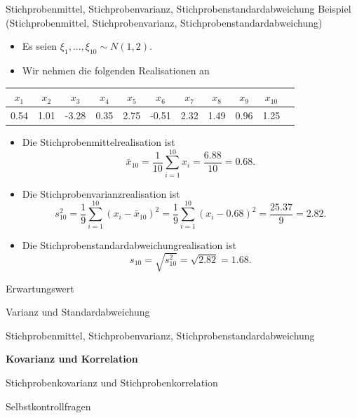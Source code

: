 \documentclass[
  8pt,
  ignorenonframetext,
]{beamer}
\providecommand{\tightlist}{%
  \setlength{\itemsep}{0pt}\setlength{\parskip}{0pt}}
\begin{document}
\begin{frame}{Stichprobenmittel, Stichprobenvarianz,
Stichprobenstandardabweichung}
\protect\hypertarget{stichprobenmittel-stichprobenvarianz-stichprobenstandardabweichung-1}{}
Beispiel (Stichprobenmittel, Stichprobenvarianz,
Stichprobenstandardabweichung) \vspace{2mm}

\footnotesize

\begin{itemize}
\tightlist
\item
  Es seien \(\xi_1,...,\xi_{10} \sim N(1,2)\).
\item
  Wir nehmen die folgenden Realisationen an
\end{itemize}

\begin{table}[h]
\begin{center}
\begin{tabular}{ccccccccccc}
   $x_1$
&  $x_2$
&  $x_3$
&  $x_4$
&  $x_5$
&  $x_6$
&  $x_7$
&  $x_8$
&  $x_9$
&  $x_{10}$ \\\hline
   0.54
&  1.01
& -3.28
&  0.35
&  2.75
& -0.51
&  2.32
&  1.49
&  0.96
&  1.25
\end{tabular}
\end{center}
\end{table}

\begin{itemize}
\tightlist
\item
  Die Stichprobenmittelrealisation ist \begin{equation}
  \bar{x}_{10}
  = \frac{1}{10}\sum_{i = 1}^{10}x_i
  = \frac{6.88}{10}
  = 0.68.
  \end{equation}
\item
  Die Stichprobenvarianzrealisation ist \begin{equation}
  s_{10}^2
  = \frac{1}{9}\sum_{i=1}^{10} (x_i - \bar{x}_{10})^2
  = \frac{1}{9}\sum_{i=1}^{10} (x_i - 0.68)^2
  = \frac{25.37}{9}
  = 2.82.
  \end{equation}
\item
  Die Stichprobenstandardabweichungrealisation ist \begin{equation}
  s_{10} = \sqrt{s_{10}^2} = \sqrt{2.82} = 1.68.
  \end{equation}
\end{itemize}
\end{frame}

\begin{frame}{}
\protect\hypertarget{section-8}{}
\large
\vfill

Erwartungswert

Varianz und Standardabweichung

Stichprobenmittel, Stichprobenvarianz, Stichprobenstandardabweichung

\textbf{Kovarianz und Korrelation}

Stichprobenkovarianz und Stichprobenkorrelation

Selbstkontrollfragen \vfill
\end{frame}
\end{document}
